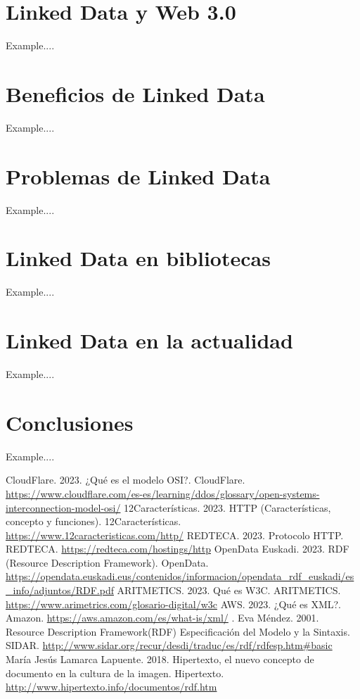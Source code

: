 \documentclass[11pt]{report}
\begin{document}
	\chapter{Linked Data y Web 3.0}
	Example....

	\chapter{Beneficios de Linked Data}
	Example....

	\chapter{Problemas de Linked Data}
	Example....

	\chapter{Linked Data en bibliotecas}
	Example....

	\chapter{Linked Data en la actualidad}
	Example....

	\chapter{Conclusiones}
	Example....

	\begin{thebibliography}{99}
	 CloudFlare. 2023.  ¿Qué es el modelo OSI?.  CloudFlare.  \url{https://www.cloudflare.com/es-es/learning/ddos/glossary/open-systems-interconnection-model-osi/}
	 12Características. 2023. HTTP (Características, concepto y funciones). 12Características. \url{https://www.12caracteristicas.com/http/}
	 REDTECA. 2023. Protocolo HTTP. REDTECA. \url{https://redteca.com/hostings/http}
	OpenData Euskadi. 2023. RDF (Resource Description Framework). OpenData. \url{https://opendata.euskadi.eus/contenidos/informacion/opendata_rdf_euskadi/es_info/adjuntos/RDF.pdf}
	 ARITMETICS. 2023. Qué es W3C. ARITMETICS. \url{https://www.arimetrics.com/glosario-digital/w3c}
	 AWS. 2023. ¿Qué es XML?. Amazon. \url{https://aws.amazon.com/es/what-is/xml/}
	.  Eva Méndez. 2001. Resource Description Framework(RDF)	Especificación del Modelo y la Sintaxis. SIDAR. \url{http://www.sidar.org/recur/desdi/traduc/es/rdf/rdfesp.htm#basic}
	 María Jesús Lamarca Lapuente. 2018. Hipertexto, el nuevo concepto de documento en la cultura de la imagen. Hipertexto. \url{http://www.hipertexto.info/documentos/rdf.htm}
	\end{thebibliography}

	
\end{document}
